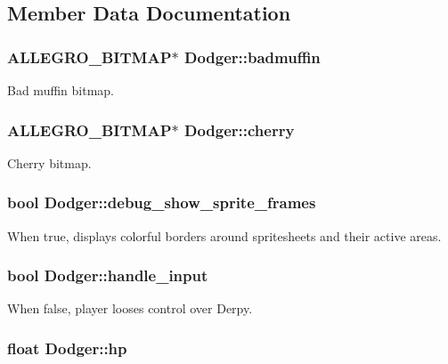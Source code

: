 \subsection{Member Data Documentation}
\hypertarget{structDodger_a10d42f3b0807e8d538e23d459de7cddc}{
\subsubsection[{badmuffin}]{\setlength{\rightskip}{0pt plus 5cm}A\+L\+L\+E\+G\+R\+O\+\_\+\+B\+I\+T\+M\+A\+P$\ast$ Dodger\+::badmuffin}}\label{structDodger_a10d42f3b0807e8d538e23d459de7cddc}
Bad muffin bitmap. \hypertarget{structDodger_a374d77e3c665e735db2c92f457d80273}{
\subsubsection[{cherry}]{\setlength{\rightskip}{0pt plus 5cm}A\+L\+L\+E\+G\+R\+O\+\_\+\+B\+I\+T\+M\+A\+P$\ast$ Dodger\+::cherry}}\label{structDodger_a374d77e3c665e735db2c92f457d80273}
Cherry bitmap. \hypertarget{structDodger_a814b9ffa7fabe1427cc5e28f0f152a53}{
\subsubsection[{debug\+\_\+show\+\_\+sprite\+\_\+frames}]{\setlength{\rightskip}{0pt plus 5cm}bool Dodger\+::debug\+\_\+show\+\_\+sprite\+\_\+frames}}\label{structDodger_a814b9ffa7fabe1427cc5e28f0f152a53}
When true, displays colorful borders around spritesheets and their active areas. \hypertarget{structDodger_ad73ee458898eeadb95285483a51d354f}{
\subsubsection[{handle\+\_\+input}]{\setlength{\rightskip}{0pt plus 5cm}bool Dodger\+::handle\+\_\+input}}\label{structDodger_ad73ee458898eeadb95285483a51d354f}
When false, player looses control over Derpy. \hypertarget{structDodger_a2a05383a1e79a65e33f229f38329c628}{
\subsubsection[{hp}]{\setlength{\rightskip}{0pt plus 5cm}float Dodger\+::hp}}\label{structDodger_a2a05383a1e79a65e33f229f38329c628}
